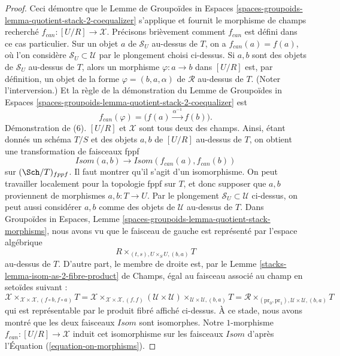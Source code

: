 \begin{proof}
\medskip\noindent
Ceci démontre que le
Lemme de Groupoïdes in Espaces
\ref{spaces-groupoids-lemma-quotient-stack-2-coequalizer}
s'applique et fournit le morphisme de champs recherché
$f_{can} : [U/R] \to \mathcal{X}$. Précisons brièvement comment
$f_{can}$ est défini dans ce cas particulier.
Sur un objet $a$ de $\mathcal{S}_U$ au-dessus de $T$,
on a $f_{can}(a) = f(a)$, où l'on considère
$\mathcal{S}_U \subset \mathcal{U}$ par le plongement choisi ci-dessus.
Si $a, b$ sont des objets de $\mathcal{S}_U$ au-dessus de $T$, alors un morphisme
$\varphi : a \to b$ dans $[U/R]$ est, par définition, un objet de la
forme $\varphi = (b, a, \alpha)$ de $\mathcal{R}$ au-dessus de $T$. (Noter
l'interversion.) Et la règle de la démonstration du
Lemme de Groupoïdes in Espaces
\ref{spaces-groupoids-lemma-quotient-stack-2-coequalizer}
est
\begin{equation}
\label{equation-on-morphisms}
f_{can}(\varphi) = \Big(f(a) \xrightarrow{\alpha^{-1}} f(b)\Big).
\end{equation}
Démonstration de (6). $[U/R]$ et $\mathcal{X}$ sont tous deux des champs.
Ainsi, étant donnés un schéma $T/S$ et des objets $a, b$ de $[U/R]$
au-dessus de $T$, on obtient une transformation de faisceaux fppf
$$
\mathit{Isom}(a, b) \longrightarrow \mathit{Isom}(f_{can}(a), f_{can}(b))
$$
sur $(\Sch/T)_{fppf}$. Il faut montrer qu'il s'agit d'un
isomorphisme. On peut travailler localement pour la topologie fppf sur $T$, et donc supposer que
$a, b$ proviennent de morphismes $a, b : T \to U$. Par le plongement
$\mathcal{S}_U \subset \mathcal{U}$ ci-dessus, on peut aussi considérer $a, b$ comme
des objets de $\mathcal{U}$ au-dessus de $T$. Dans
Groupoïdes in Espaces,
Lemme \ref{spaces-groupoids-lemma-quotient-stack-morphisms},
nous avons vu que le faisceau de gauche est représenté par l'espace algébrique
$$
R \times_{(t, s), U \times_S U, (b, a)} T
$$
au-dessus de $T$. D'autre part, le membre de droite est, par le
Lemme \ref{stacks-lemma-isom-as-2-fibre-product} de Champs,
égal au faisceau associé au champ en setoïdes suivant :
$$
\mathcal{X}
\times_{\mathcal{X} \times \mathcal{X}, (f \circ b, f \circ a)} T =
\mathcal{X}
\times_{\mathcal{X} \times \mathcal{X}, (f, f)}
(\mathcal{U} \times \mathcal{U})
\times_{\mathcal{U} \times \mathcal{U}, (b, a)} T =
\mathcal{R}
\times_{(\text{pr}_0, \text{pr}_1), \mathcal{U} \times \mathcal{U}, (b, a)} T
$$
qui est représentable par le produit fibré affiché ci-dessus.
À ce stade, nous avons montré que les deux faisceaux $\mathit{Isom}$
sont isomorphes. Notre $1$-morphisme $f_{can} : [U/R] \to \mathcal{X}$ induit
cet isomorphisme sur les faisceaux $\mathit{Isom}$ d'après
l'Équation (\ref{equation-on-morphisms}).
\end{proof}

